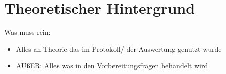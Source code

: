\section{Theoretischer Hintergrund}
Was muss rein:
\begin{itemize}
    \item Alles an Theorie das im Protokoll/ der Auswertung genutzt wurde
    \item AUßER: Alles was in den Vorbereitungsfragen behandelt wird
\end{itemize}


